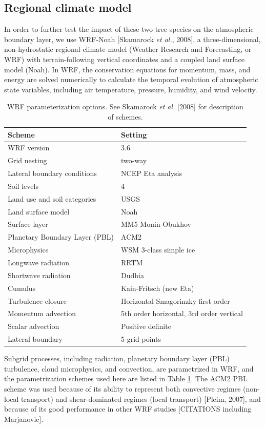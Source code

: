 \subsection{Regional climate model}
In order to further test the impact of these two tree species on the atmospheric boundary layer, we use WRF-Noah [Skamarock \textit{et al.}, 2008], a three-dimensional, non-hydrostatic regional climate model (Weather Research and Forecasting, or WRF) with terrain-following vertical coordinates and a coupled land surface model (Noah).  In WRF, the conservation equations for momentum, mass, and energy are solved numerically to calculate the temporal evolution of atmospheric state variables, including air temperature, pressure, humidity, and wind velocity.  

\begin{table}
\begin{tabular}{l l}
\hline
Scheme & Setting \\ \hline
WRF version & 3.6 \\
Grid nesting & two-way \\
Lateral boundary conditions & NCEP Eta analysis \\
Soil levels & 4 \\
Land use and soil categories & USGS \\
Land surface model & Noah \\
Surface layer & MM5 Monin-Obukhov \\
Planetary Boundary Layer (PBL) & ACM2 \\
Microphysics & WSM 3-class simple ice \\
Longwave radiation & RRTM \\
Shortwave radiation & Dudhia \\
Cumulus & Kain-Fritsch (new Eta) \\
Turbulence closure & Horizontal Smagorinzky first order \\
Momentum advection & 5th order horizontal, 3rd order vertical \\
Scalar advection & Positive definite \\
Lateral boundary & 5 grid points \\
\hline
\end{tabular}
\caption{WRF parameterization options.  See Skamarock \textit{et al.} [2008] for description of schemes.}
\label{table:BL_paramschemes}
\end{table}

Subgrid processes, including radiation, planetary boundary layer (PBL) turbulence, cloud microphysics, and convection, are parametrized in WRF, and the parametrization schemes used here are listed in Table \ref{table:BL_paramschemes}.  The ACM2 PBL scheme was used because of its ability to represent both convective regimes (non-local transport) and shear-dominated regimes (local transport) [Pleim, 2007], and because of its good performance in other WRF studies [CITATIONS including Marjanovic].

